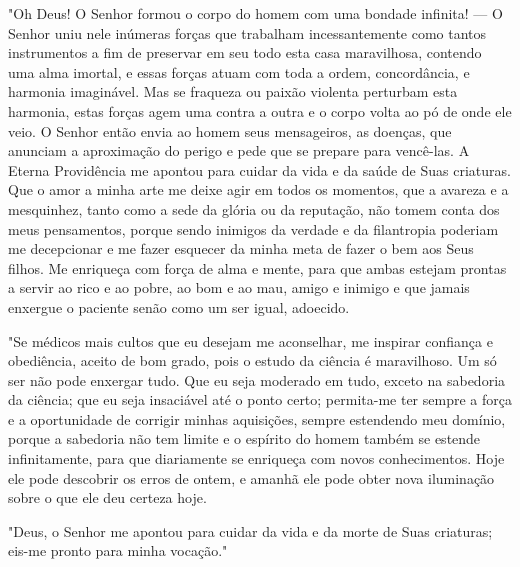 \begin{itemize}
\begin{enumrate}
"Oh Deus! O Senhor formou o corpo do homem com uma bonda­de infinita!
--- O Senhor uniu nele inúmeras forças que trabalham incessante­mente
como tantos instrumentos a fim de preservar em seu todo esta casa
ma­ravilhosa, contendo uma alma imortal, e essas forças atuam com toda a
ordem, concordância, e harmonia imaginável. Mas se fraqueza ou paixão
violenta per­turbam esta harmonia, estas forças agem uma contra a outra
e o corpo volta ao pó de onde ele veio. O Senhor então envia ao homem
seus mensageiros, as doenças, que anunciam a aproximação do perigo e
pede que se prepare para vencê-las. A Eterna Providência me apontou para
cuidar da vida e da saúde de Suas criaturas. Que o amor a minha arte me
deixe agir em todos os momentos, que a avareza e a mesquinhez, tanto
como a sede da glória ou da reputação, não tomem conta dos meus
pensamentos, porque sendo inimigos da verdade e da filantropia poderiam
me decepcionar e me fazer esquecer da minha meta de fazer o bem aos Seus
filhos. Me enriqueça com força de alma e mente, para que ambas estejam
prontas a servir ao rico e ao pobre, ao bom e ao mau, amigo e inimigo e
que jamais enxergue o paciente senão como um ser igual, adoecido.

"Se médicos mais cultos que eu desejam me aconselhar, me inspirar
confiança e obediência, aceito de bom grado, pois o estudo da ciência é
mara­vilhoso. Um só ser não pode enxergar tudo. Que eu seja moderado em
tudo, exceto na sabedoria da ciência; que eu seja insaciável até o ponto
certo; permi­ta-me ter sempre a força e a oportunidade de corrigir
minhas aquisições, sem­pre estendendo meu domínio, porque a sabedoria
não tem limite e o espírito do homem também se estende infinitamente,
para que diariamente se enrique­ça com novos conhecimentos. Hoje ele
pode descobrir os erros de ontem, e amanhã ele pode obter nova
iluminação sobre o que ele deu certeza hoje.

"Deus, o Senhor me apontou para cuidar da vida e da morte de Suas
criaturas; eis-me pronto para minha vocação."


\end{enumrate}
\end{itemize}
